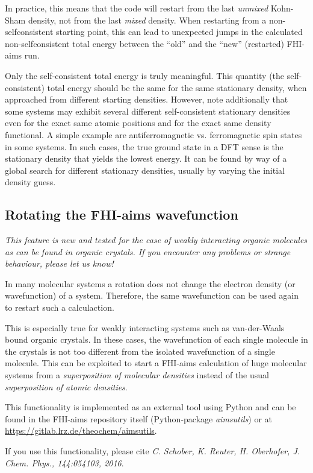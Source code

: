 In practice, this means that the code will restart
from the last \emph{unmixed} Kohn-Sham density, not from the last
\emph{mixed} density. When restarting from a non-selfconsistent
starting point, this can lead to unexpected jumps in the calculated
non-selfconsistent total energy between the ``old'' and the ``new'' 
(restarted) FHI-aims run.

Only the self-consistent total energy is truly meaningful. This quantity (the
self-consistent) total energy should be the same for the same
stationary density, when approached from different starting densities.
However, note additionally that some systems may exhibit several
different self-consistent stationary densities even for 
the exact same atomic positions and for the exact same density functional. 
A simple example are
antiferromagnetic vs. ferromagnetic spin states in some systems. In
such cases, the true ground state in a DFT sense is the stationary density 
that yields the lowest energy. It can be found by way of a global search for
different stationary densities, usually by varying the initial density guess.


\subsection{Rotating the FHI-aims wavefunction}
\emph{This feature is new and tested for the case of weakly interacting organic
        molecules as can be found in organic crystals. If you encounter any
        problems or strange behaviour, please let us know!}

In many molecular systems a rotation does not change the electron density
(or wavefunction) of a system. Therefore, the same wavefunction can be used
again to restart such a calculaction.

This is especially true for weakly interacting systems such as van-der-Waals
bound organic crystals. In these cases, the wavefunction of each single molecule
in the crystals is not too different from the isolated wavefunction of a single
molecule. This can be exploited to start a FHI-aims calculation of huge
molecular systems from a \emph{superposition of molecular densities} instead of
the usual \emph{superposition of atomic densities}. 

This functionality is implemented as an external tool using Python and can be
found in the FHI-aims repository itself (Python-package \emph{aimsutils}) or at
\url{https://gitlab.lrz.de/theochem/aimsutils}.

If you use this functionality, please cite \emph{C. Schober, K. Reuter, H.
        Oberhofer, J. Chem. Phys., 144:054103, 2016}\cite{Schober2015}.

